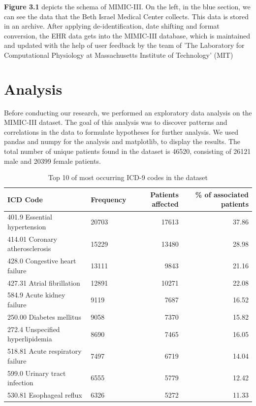 \documentclass[11pt, a4paper, oneside]{book}
\begin{document}
\textbf{Figure 3.1} depicts the schema of MIMIC-III. On the left, in the blue section, we can see the data that the Beth Israel Medical Center collects. This data is stored in an archive. After applying de-identification, date shifting and format conversion, the EHR data gets into the MIMIC-III database, which is maintained and updated with the help of user feedback by the team of 'The Laboratory for Computational Physiology at Massachusetts Institute of Technology' (MIT) \citep{johnson2016mimic}
\section{Analysis}

Before conducting our research, we performed an exploratory data analysis on the MIMIC-III dataset. The goal of this analysis was to discover patterns and correlations in the data to formulate hypotheses for further analysis. We used pandas and numpy for the analysis and matplotlib, to display the results. The total number of unique patients found in the dataset is 46520, consisting of 26121 male and 20399 female patients.


\begin{table}
\begin{tabularx}{\textwidth}{X|l|r|r}
\textbf{ICD Code } & \textbf{Frequency} & \textbf{Patients affected} & \textbf{\% of associated patients} \\
\hline
401.9 Essential hypertension & 20703 & 17613 & 37.86\\
414.01 Coronary atherosclerosis & 15229 & 13480 & 28.98 \\
428.0 Congestive heart failure &   13111 & 9843 &21.16\\
427.31 Atrial fibrillation&    12891 & 10271 &  22.08\\
584.9 Acute kidney failure &  9119 & 7687& 16.52\\
250.00 Diabetes mellitus &  9058 & 7370 & 15.82\\
272.4 Unspecified hyperlipidemia & 8690 & 7465 & 16.05 \\
518.81 Acute respiratory failure & 7497 & 6719 & 14.04 \\
599.0 Urinary tract infection &  6555 & 5779 & 12.42 \\
530.81 Esophageal reflux &  6326 & 5272 & 11.33\\
\end{tabularx}
\caption{\label{tab:top10-codes-dataset}Top 10 of most occurring ICD-9 codes in the dataset}
\end{table}
\end{document}
